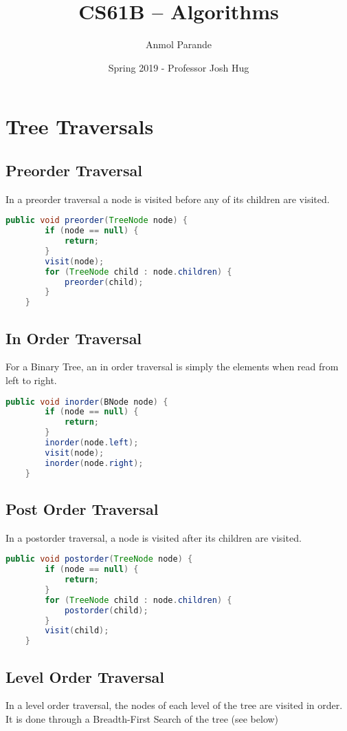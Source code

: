 \documentclass{article}
\begin{document}
    \title{CS61B -- Algorithms}
    \author{Anmol Parande}
    \date{Spring 2019 - Professor Josh Hug}
    \maketitle

\section{Tree Traversals}
\subsection{Preorder Traversal}
In a preorder traversal a node is visited before any of its children are visited.
\begin{lstlisting}[language=Java]
    public void preorder(TreeNode node) {
        if (node == null) {
            return;
        }
        visit(node);
        for (TreeNode child : node.children) {
            preorder(child);
        }
    }
\end{lstlisting}
\subsection{In Order Traversal}
For a Binary Tree, an in order traversal is simply the elements when read from left to right.
\begin{lstlisting}[language=Java]
    public void inorder(BNode node) {
        if (node == null) {
            return;
        }
        inorder(node.left);
        visit(node);
        inorder(node.right);
    }
\end{lstlisting}
\subsection{Post Order Traversal}
In a postorder traversal, a node is visited after its children are visited.
\begin{lstlisting}[language=Java]
    public void postorder(TreeNode node) {
        if (node == null) {
            return;
        }
        for (TreeNode child : node.children) {
            postorder(child);
        }
        visit(child);
    }
\end{lstlisting}
\subsection{Level Order Traversal}
In a level order traversal, the nodes of each level of the tree are visited in order.
It is done through a Breadth-First Search of the tree (see below)
\end{document}
